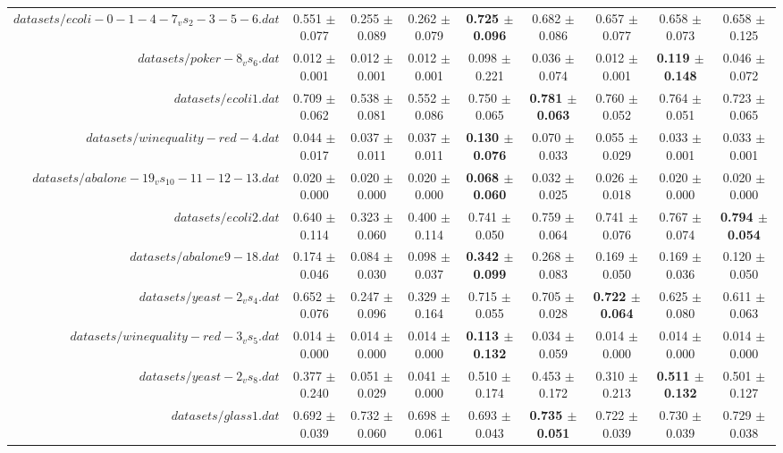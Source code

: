 \begin{table}[!ht]
{\begin{tabular}{r c c c c c c c c}
$datasets/ecoli-0-1-4-7_vs_2-3-5-6.dat$ & 0.551 $\pm$ 0.077 & 0.255 $\pm$ 0.089 & 0.262 $\pm$ 0.079 & \textbf{0.725 $\pm$ 0.096} & 0.682 $\pm$ 0.086 & 0.657 $\pm$ 0.077 & 0.658 $\pm$ 0.073 & 0.658 $\pm$ 0.125 \\
$datasets/poker-8_vs_6.dat$ & 0.012 $\pm$ 0.001 & 0.012 $\pm$ 0.001 & 0.012 $\pm$ 0.001 & 0.098 $\pm$ 0.221 & 0.036 $\pm$ 0.074 & 0.012 $\pm$ 0.001 & \textbf{0.119 $\pm$ 0.148} & 0.046 $\pm$ 0.072 \\
$datasets/ecoli1.dat$ & 0.709 $\pm$ 0.062 & 0.538 $\pm$ 0.081 & 0.552 $\pm$ 0.086 & 0.750 $\pm$ 0.065 & \textbf{0.781 $\pm$ 0.063} & 0.760 $\pm$ 0.052 & 0.764 $\pm$ 0.051 & 0.723 $\pm$ 0.065 \\
$datasets/winequality-red-4.dat$ & 0.044 $\pm$ 0.017 & 0.037 $\pm$ 0.011 & 0.037 $\pm$ 0.011 & \textbf{0.130 $\pm$ 0.076} & 0.070 $\pm$ 0.033 & 0.055 $\pm$ 0.029 & 0.033 $\pm$ 0.001 & 0.033 $\pm$ 0.001 \\
$datasets/abalone-19_vs_10-11-12-13.dat$ & 0.020 $\pm$ 0.000 & 0.020 $\pm$ 0.000 & 0.020 $\pm$ 0.000 & \textbf{0.068 $\pm$ 0.060} & 0.032 $\pm$ 0.025 & 0.026 $\pm$ 0.018 & 0.020 $\pm$ 0.000 & 0.020 $\pm$ 0.000 \\
$datasets/ecoli2.dat$ & 0.640 $\pm$ 0.114 & 0.323 $\pm$ 0.060 & 0.400 $\pm$ 0.114 & 0.741 $\pm$ 0.050 & 0.759 $\pm$ 0.064 & 0.741 $\pm$ 0.076 & 0.767 $\pm$ 0.074 & \textbf{0.794 $\pm$ 0.054} \\
$datasets/abalone9-18.dat$ & 0.174 $\pm$ 0.046 & 0.084 $\pm$ 0.030 & 0.098 $\pm$ 0.037 & \textbf{0.342 $\pm$ 0.099} & 0.268 $\pm$ 0.083 & 0.169 $\pm$ 0.050 & 0.169 $\pm$ 0.036 & 0.120 $\pm$ 0.050 \\
$datasets/yeast-2_vs_4.dat$ & 0.652 $\pm$ 0.076 & 0.247 $\pm$ 0.096 & 0.329 $\pm$ 0.164 & 0.715 $\pm$ 0.055 & 0.705 $\pm$ 0.028 & \textbf{0.722 $\pm$ 0.064} & 0.625 $\pm$ 0.080 & 0.611 $\pm$ 0.063 \\
$datasets/winequality-red-3_vs_5.dat$ & 0.014 $\pm$ 0.000 & 0.014 $\pm$ 0.000 & 0.014 $\pm$ 0.000 & \textbf{0.113 $\pm$ 0.132} & 0.034 $\pm$ 0.059 & 0.014 $\pm$ 0.000 & 0.014 $\pm$ 0.000 & 0.014 $\pm$ 0.000 \\
$datasets/yeast-2_vs_8.dat$ & 0.377 $\pm$ 0.240 & 0.051 $\pm$ 0.029 & 0.041 $\pm$ 0.000 & 0.510 $\pm$ 0.174 & 0.453 $\pm$ 0.172 & 0.310 $\pm$ 0.213 & \textbf{0.511 $\pm$ 0.132} & 0.501 $\pm$ 0.127 \\
$datasets/glass1.dat$ & 0.692 $\pm$ 0.039 & 0.732 $\pm$ 0.060 & 0.698 $\pm$ 0.061 & 0.693 $\pm$ 0.043 & \textbf{0.735 $\pm$ 0.051} & 0.722 $\pm$ 0.039 & 0.730 $\pm$ 0.039 & 0.729 $\pm$ 0.038 \\

\end{tabular}}
\end{table}
